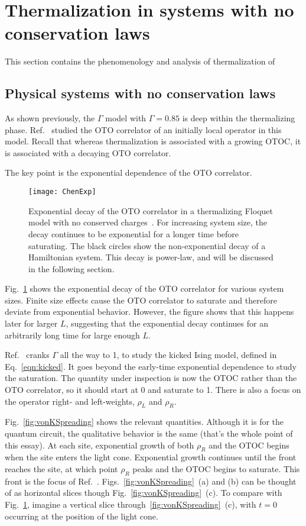 \documentclass[a4paper,12pt]{article}
\begin{document}
\section{Thermalization in systems with no conservation laws} \label{sec:ncons}

This section contains the phenomenology and analysis of thermalization of 

\subsection{Physical systems with no conservation laws} \label{sub:fncons}

As shown previously, the $\Gamma$ model with $\Gamma=0.85$ is deep within the thermalizing phase. Ref.~\cite{ChenOtoc} studied the OTO correlator of an initially local operator in this model. Recall that whereas thermalization is associated with a growing OTOC, it is associated with a decaying OTO correlator.

The key point is the exponential dependence of the OTO correlator. 
\begin{figure}
	\centering
	\texttt{[image: ChenExp]}
	\caption{Exponential decay of the OTO correlator in a thermalizing Floquet model with no conserved charges~\cite{ChenOtoc}. For increasing system size, the decay continues to be exponential for a longer time before saturating. The black circles show the non-exponential decay of a Hamiltonian system. This decay is power-law, and will be discussed in the following section.}
	\label{fig:ChenExp}
\end{figure}
Fig.~\ref{fig:ChenExp} shows the exponential decay of the OTO correlator for various system sizes. Finite size effects cause the OTO correlator to saturate and therefore deviate from exponential behavior. However, the figure shows that this happens later for larger $L$, suggesting that the exponential decay continues for an arbitrarily long time for large enough $L$.

Ref.~\cite{vonKeyserlingkHydro} cranks $\Gamma$ all the way to 1, to study the kicked Ising model, defined in Eq.~\ref{eqn:kicked}. It goes beyond the early-time exponential dependence to study the saturation. The quantity under inspection is now the OTOC rather than the OTO correlator, so it should start at 0 and saturate to 1. There is also a focus on the operator right- and left-weights, $\rho_L$ and $\rho_R$.

Fig.~\ref{fig:vonKSpreading} shows the relevant quantities. Although it is for the quantum circuit, the qualitative behavior is the same (that's the whole point of this essay). At each site, exponential growth of both $\rho_R$ and the OTOC begins when the site enters the light cone. Exponential growth continues until the front reaches the site, at which point $\rho_R$ peaks and the OTOC begins to saturate. This front is the focus of Ref.~\cite{vonKeyserlingkHydro}.
Figs.~\ref{fig:vonKSpreading}~(a) and (b) can be thought of as horizontal slices though Fig.~\ref{fig:vonKSpreading}~(c). To compare with Fig.~\ref{fig:ChenExp}, imagine a vertical slice through~\ref{fig:vonKSpreading}~(c), with $t=0$ occurring at the position of the light cone.
\end{document}
